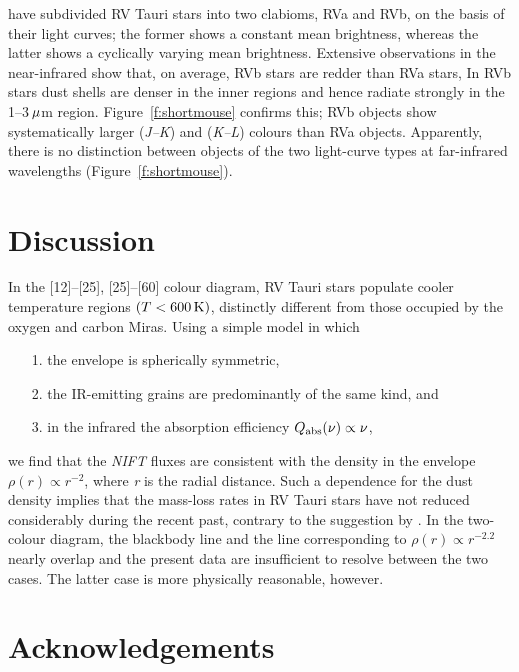 \documentclass[useAMS,usenatbib, referree]{biom}
\begin{document}
\citet{b13} have subdivided RV Tauri stars into two clabioms, RVa and
RVb, on the basis of their light curves; the former shows a constant
mean brightness, whereas the latter shows a cyclically varying mean
brightness. Extensive observations in the near-infrared show that, on
average, RVb stars are redder than RVa stars, In RVb stars dust shells
are denser in the inner regions and hence radiate strongly in the
1--3$\,\mu$m region. Figure~\ref{f:shortmouse} confirms this; RVb
objects show systematically larger ({\it J--K\/}) and ({\it K--L\/})
colours than RVa objects. Apparently, there is no distinction between
objects of the two light-curve types at far-infrared wavelengths
(Figure~\ref{f:shortmouse}).

\section{Discussion}
\label{s:discuss}

In the [12]--[25], [25]--[60] colour diagram, RV Tauri stars populate
cooler temperature regions $(T<600 \,{\mathrm{K}})$, distinctly different from
those occupied by the oxygen and carbon Miras. Using a simple model
in which
\begin{enumerate}
  \item[1.] the envelope is spherically symmetric,
  \item[2.] the IR-emitting grains are predominantly of the same kind, and
  \item[3.] in the infrared the absorption efficiency $Q_{{\mathrm{abs}}}
        (\nu)\propto\nu$,
\end{enumerate}
we find that the {\it NIFT\/} fluxes are consistent with the
density in the envelope $\rho(r)\propto r^{-2}$, where {\it r\/}
is the radial distance. Such a dependence for the dust density
implies that the mass-loss rates in RV Tauri stars have not
reduced considerably during the recent past, contrary to the
suggestion by \citet{b12}. In the two-colour diagram, the
blackbody line and the line corresponding to $\rho(r)\propto
r^{-2.2}$ nearly overlap and the present data are insufficient to
resolve between the two cases. The latter case is more physically
reasonable, however.

\backmatter


\section*{Acknowledgements}
\end{document}

